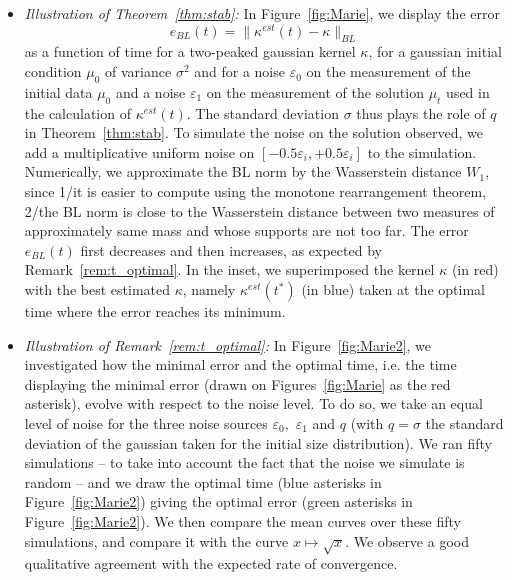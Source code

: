 \documentclass[AHL,Unicode,longabstracts,published]{cedram}
\newcommand*\eps{\varepsilon}
\begin{document}
\begin{itemize}
\noindent In Figure~\ref{fig:cor2:time1}, we display the shape of the estimated kernel $\kappa^{est}(t)$ for a small value of $t$, for a kernel $\kappa$ of erosion type and with three initial conditions being Gaussians with various spreading. It can be observed at the naked eye that the thinner the gaussian is, the better the approximation $\kappa^{est}(t)$ is as well. We observe how the estimated kernel $\kappa^{est}$ is differently impacted around $x=0$ and around $x=1$: this gives interesting hints on how the kernel symmetry could be used to improve the theoretical estimates.

\vspace*{4pt}
\item \emph{Illustration of Theorem~\ref{thm:stab}:\;} In Figure~\ref{fig:Marie}, we display the error
\[
e_{BL}(t)=\|\kappa^{est}(t)-\kappa\|_{BL}
\]
as a function of time for a two-peaked gaussian kernel $\kappa$, for a gaussian initial condition $\mu_0$ of variance $\sigma^2$ and for a noise $\eps_0$ on the measurement of the initial data $\mu_0$ and a noise $\eps_1$ on the measurement of the solution $\mu_t$ used in the calculation of $\kappa^{est}(t)$. The standard deviation $\sigma$ thus plays the role of $q$ in Theorem~\ref{thm:stab}. To simulate the noise on the solution observed, we add a multiplicative uniform noise on $[-0.5\varepsilon_i,+0.5\varepsilon_i]$ to the simulation.
Numerically, we approximate the BL norm by the Wasserstein distance $W_1$, since 1/it is easier to compute using the monotone rearrangement theorem, 2/the BL norm is close to the Wasserstein distance between two measures of approximately same mass and whose supports are not too far. The error $e_{BL}(t)$ first decreases and then increases, as expected by Remark~\ref{rem:t_optimal}. In the inset, we superimposed the kernel $\kappa$ (in red) with the best estimated $\kappa$, namely $\kappa^{est}(t^*)$ (in blue) taken at the optimal time where the error reaches its minimum.
\end{itemize}


\begin{itemize}
\item \emph{Illustration of Remark~\ref{rem:t_optimal}:\;} In Figure~\ref{fig:Marie2}, we investigated how the minimal error and the optimal time, i.e. the time displaying the minimal error (drawn on Figures~\ref{fig:Marie} as the red asterisk), evolve with respect to the noise level. To do so, we take an equal level of noise for the three noise sources $\eps_0,$ $\eps_1$ and $q$ (with $q=\sigma$ the standard deviation of the gaussian taken for the initial size distribution). We ran fifty simulations -- to take into account the fact that the noise we simulate is random -- and we draw the optimal time (blue asterisks in Figure~\ref{fig:Marie2}) giving the optimal error (green asterisks in Figure~\ref{fig:Marie2}). We then compare the mean curves over these fifty simulations, and compare it with the curve $x \mapsto \sqrt{x}$. We observe a good qualitative agreement with the expected rate of convergence.
\end{itemize}
\end{document}
